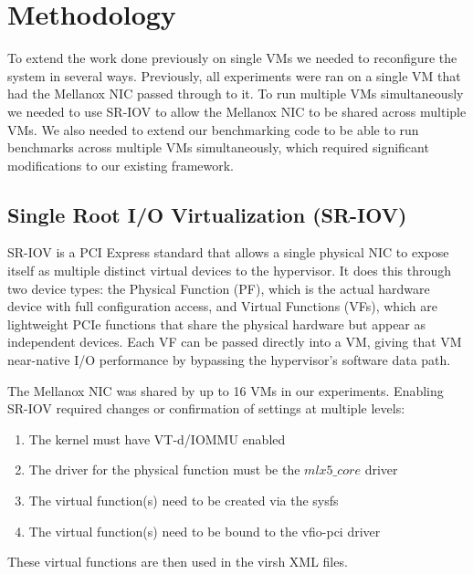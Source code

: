 \section{Methodology}
\label{sec:methodology}
To extend the work done previously on single VMs we needed to reconfigure the system in several ways. Previously, all experiments were ran on a single VM that had the Mellanox NIC passed through to it. To run multiple VMs simultaneously we needed to use SR-IOV to allow the Mellanox NIC to be shared across multiple VMs. We also needed to extend our benchmarking code to be able to run benchmarks across multiple VMs simultaneously, which required significant modifications to our existing framework.

\subsection{Single Root I/O Virtualization (SR-IOV)}
SR-IOV is a PCI Express standard that allows a single physical NIC to expose itself as multiple distinct virtual devices to the hypervisor. It does this through two device types: the Physical Function (PF), which is the actual hardware device with full configuration access, and Virtual Functions (VFs), which are lightweight PCIe functions that share the physical hardware but appear as independent devices. Each VF can be passed directly into a VM, giving that VM near-native I/O performance by bypassing the hypervisor's software data path.

The Mellanox NIC was shared by up to 16 VMs in our experiments. Enabling SR-IOV required changes or confirmation of settings at multiple levels: 
\begin{enumerate}
    \item The kernel must have VT-d/IOMMU enabled
    \item The driver for the physical function must be the $mlx5\_core$ driver
    \item The virtual function(s) need to be created via the sysfs
    \item The virtual function(s) need to be bound to the vfio-pci driver
\end{enumerate}

These virtual functions are then used in the virsh XML files.

